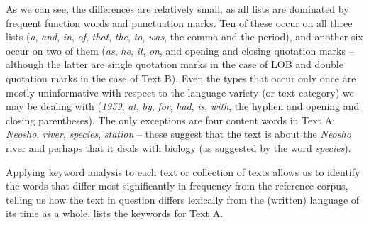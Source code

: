 As we can see, the differences are relatively small, as all lists are dominated by frequent function words and punctuation marks. Ten of these occur on all three lists (\textit{a}, \textit{and}, \textit{in}, \textit{of}, \textit{that}, \textit{the}, \textit{to}, \textit{was}, the comma and the period), and another six occur on two of them (\textit{as}, \textit{he}, \textit{it}, \textit{on}, and opening and closing quotation marks -- although the latter are single quotation marks in the case of LOB  and double quotation marks in the case of Text B). Even the types  that occur only once are mostly uninformative with respect to the language variety  (or text category) we may be dealing with (\textit{1959}, \textit{at}, \textit{by}, \textit{for}, \textit{had}, \textit{is}, \textit{with}, the hyphen and opening and closing parentheses). The only exceptions are four content words in Text A: \textit{Neosho}, \textit{river}, \textit{species}, \textit{station} -- these suggest that the text is about the \textit{Neosho} river and perhaps that it deals with biology (as suggested by the word \textit{species}).

Applying keyword  analysis to each text or collection of texts allows us to identify the words that differ most significantly in frequency from the reference corpus, telling us how the text in question differs lexically from the (written)  language of its time as a whole.  lists the keywords  for Text A.

